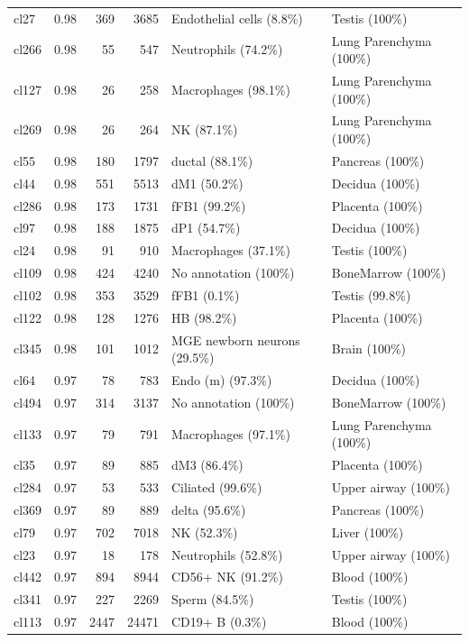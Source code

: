 \begin{table}[ht!]
\begin{tabular}{lrrrll}
  cl27 & 0.98 & 369 & 3685 & Endothelial cells (8.8\%) & Testis (100\%) \\ 
  cl266 & 0.98 &  55 & 547 & Neutrophils (74.2\%) & Lung Parenchyma (100\%) \\ 
  cl127 & 0.98 &  26 & 258 & Macrophages (98.1\%) & Lung Parenchyma (100\%) \\ 
  cl269 & 0.98 &  26 & 264 & NK (87.1\%) & Lung Parenchyma (100\%) \\ 
  cl55 & 0.98 & 180 & 1797 & ductal (88.1\%) & Pancreas (100\%) \\ 
  cl44 & 0.98 & 551 & 5513 & dM1 (50.2\%) & Decidua (100\%) \\ 
  cl286 & 0.98 & 173 & 1731 & fFB1 (99.2\%) & Placenta (100\%) \\ 
  cl97 & 0.98 & 188 & 1875 & dP1 (54.7\%) & Decidua (100\%) \\ 
  cl24 & 0.98 &  91 & 910 & Macrophages (37.1\%) & Testis (100\%) \\ 
  cl109 & 0.98 & 424 & 4240 & No annotation (100\%) & BoneMarrow (100\%) \\ 
  cl102 & 0.98 & 353 & 3529 & fFB1 (0.1\%) & Testis (99.8\%) \\ 
  cl122 & 0.98 & 128 & 1276 & HB (98.2\%) & Placenta (100\%) \\ 
  cl345 & 0.98 & 101 & 1012 & MGE newborn neurons (29.5\%) & Brain (100\%) \\ 
  cl64 & 0.97 &  78 & 783 & Endo (m) (97.3\%) & Decidua (100\%) \\ 
  cl494 & 0.97 & 314 & 3137 & No annotation (100\%) & BoneMarrow (100\%) \\ 
  cl133 & 0.97 &  79 & 791 & Macrophages (97.1\%) & Lung Parenchyma (100\%) \\ 
  cl35 & 0.97 &  89 & 885 & dM3 (86.4\%) & Placenta (100\%) \\ 
  cl284 & 0.97 &  53 & 533 & Ciliated (99.6\%) & Upper airway (100\%) \\ 
  cl369 & 0.97 &  89 & 889 & delta (95.6\%) & Pancreas (100\%) \\ 
  cl79 & 0.97 & 702 & 7018 & NK (52.3\%) & Liver (100\%) \\ 
  cl23 & 0.97 &  18 & 178 & Neutrophils (52.8\%) & Upper airway (100\%) \\ 
  cl442 & 0.97 & 894 & 8944 & CD56+ NK (91.2\%) & Blood (100\%) \\ 
  cl341 & 0.97 & 227 & 2269 & Sperm (84.5\%) & Testis (100\%) \\ 
  cl113 & 0.97 & 2447 & 24471 & CD19+ B (0.3\%) & Blood (100\%) \\ 

\end{tabular}
\end{table}
